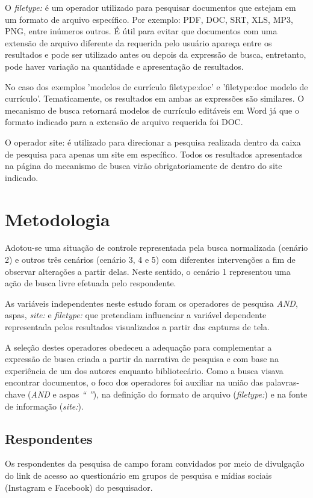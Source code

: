 \documentclass[portuguese]{textolivre}
\begin{document}
O \textit{filetype:} é um operador utilizado para pesquisar documentos que estejam em um formato de arquivo específico. Por exemplo: PDF, DOC, SRT, XLS, MP3, PNG, entre inúmeros outros. É útil para evitar que documentos com uma extensão de arquivo diferente da requerida pelo usuário apareça entre os resultados e pode ser utilizado antes ou depois da expressão de busca, entretanto, pode haver variação na quantidade e apresentação de resultados.

No caso dos exemplos 'modelos de currículo filetype:doc' e 'filetype:doc modelo de currículo'. Tematicamente, os resultados em ambas as expressões são similares. O mecanismo de busca retornará modelos de currículo editáveis em Word já que o formato indicado para a extensão de arquivo requerida foi DOC.

O operador site: é utilizado para direcionar a pesquisa realizada dentro da caixa de pesquisa para apenas um site em específico. Todos os resultados apresentados na página do mecanismo de busca virão obrigatoriamente de dentro do site indicado.


\section{Metodologia}\label{sec-formato}
Adotou-se uma situação de controle representada pela busca normalizada (cenário 2) e outros três cenários (cenário 3, 4 e 5) com diferentes intervenções a fim de observar alterações a partir delas. Neste sentido, o cenário 1 representou uma ação de busca livre efetuada pelo respondente.

As variáveis independentes neste estudo foram os operadores de pesquisa \textit{AND}, aspas, \textit{site:} e \textit{filetype:} que pretendiam influenciar a variável dependente representada pelos resultados visualizados a partir das capturas de tela.

A seleção destes operadores obedeceu a adequação para complementar a expressão de busca criada a partir da narrativa de pesquisa e com base na experiência de um dos autores enquanto bibliotecário. Como a busca visava encontrar documentos, o foco dos operadores foi auxiliar na união das palavras-chave (\textit{AND} e aspas \textit{“ ”}), na definição do formato de arquivo (\textit{filetype:}) e na fonte de informação (\textit{site:}).


\subsection{Respondentes}\label{sec-modelo}
Os respondentes da pesquisa de campo foram convidados por meio de divulgação do link de acesso ao questionário em grupos de pesquisa e mídias sociais (Instagram e Facebook) do pesquisador.
\end{document}
